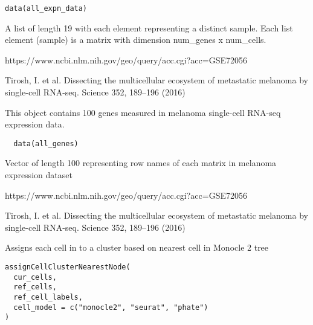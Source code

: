 \documentclass[a4paper]{book}
\begin{document}
%
\begin{Usage}
\begin{verbatim}
data(all_expn_data)
\end{verbatim}
\end{Usage}
%
\begin{Format}
A list of length 19 with each element representing a distinct sample. Each list element (sample) is a matrix with dimension num\_genes x num\_cells.
\end{Format}
%
\begin{Source}\relax
https://www.ncbi.nlm.nih.gov/geo/query/acc.cgi?acc=GSE72056
\end{Source}
%
\begin{References}\relax
Tirosh, I. et al. Dissecting the multicellular ecosystem of metastatic melanoma by single-cell RNA-seq. Science 352, 189–196 (2016)
\end{References}
%
\begin{Description}\relax
This object contains 100 genes measured in melanoma single-cell RNA-seq expression data.
\end{Description}
%
\begin{Usage}
\begin{verbatim}
  data(all_genes)
\end{verbatim}
\end{Usage}
%
\begin{Format}
Vector of length 100 representing row names of each matrix in melanoma expression dataset
\end{Format}
%
\begin{Source}\relax
https://www.ncbi.nlm.nih.gov/geo/query/acc.cgi?acc=GSE72056
\end{Source}
%
\begin{References}\relax
Tirosh, I. et al. Dissecting the multicellular ecosystem of metastatic melanoma by single-cell RNA-seq. Science 352, 189–196 (2016)
\end{References}
%
\begin{Description}\relax
Assigns each cell in  to a cluster based on nearest cell in Monocle 2 tree
\end{Description}
%
\begin{Usage}
\begin{verbatim}
assignCellClusterNearestNode(
  cur_cells,
  ref_cells,
  ref_cell_labels,
  cell_model = c("monocle2", "seurat", "phate")
)
\end{verbatim}
\end{Usage}
\end{document}
